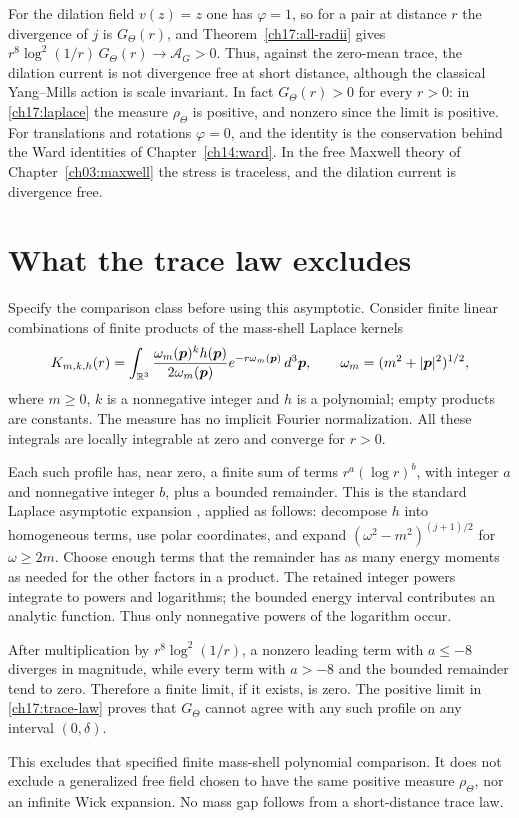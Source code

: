 For the dilation field $v(z)=z$ one has $\varphi=1$, so for a pair at
distance $r$ the divergence of $j$ is $G_\Theta(r)$, and
Theorem~\ref{ch17:all-radii} gives
$r^8\log^2(1/r)\,G_\Theta(r)\to\mathcal A_G>0$. Thus, against the zero-mean
trace, the dilation current is not divergence free at short distance, although the classical
Yang--Mills action is scale invariant. In fact $G_\Theta(r)>0$ for every
$r>0$: in \eqref{ch17:laplace} the measure $\rho_\Theta$ is positive, and
nonzero since the limit is positive. For translations and rotations
$\varphi=0$, and the identity is the conservation behind the Ward identities
of Chapter~\ref{ch14:ward}. In the free Maxwell theory of
Chapter~\ref{ch03:maxwell} the stress is traceless, and the dilation
current is divergence free.


\section{What the trace law excludes}
\label{ch17:exclusion}

Specify the comparison class before using this asymptotic. Consider finite
linear combinations of finite products of the mass-shell Laplace kernels
\[
 K_{m,k,h}(r)=\int_{\mathbb R^3}
 \frac{\omega_m(\boldsymbol p)^k h(\boldsymbol p)}{2\omega_m(\boldsymbol p)}
 e^{-r\omega_m(\boldsymbol p)}\,d^3\boldsymbol p,
 \qquad\omega_m=(m^2+|\boldsymbol p|^2)^{1/2},
\]
where $m\ge0$, $k$ is a nonnegative integer and $h$ is a polynomial;
empty products are constants. The measure has no implicit Fourier
normalization. All these integrals are locally integrable at zero
and converge for $r>0$.

Each such profile has, near zero, a finite sum of terms
$r^a(\log r)^b$, with integer $a$ and nonnegative integer $b$,
plus a bounded remainder. This is the standard Laplace asymptotic expansion
\cite{Wong2001}, applied as follows: decompose $h$ into homogeneous terms,
use polar coordinates, and expand
$(\omega^2-m^2)^{(j+1)/2}$ for $\omega\ge2m$.
Choose enough terms that the remainder has as many energy moments
as needed for the other factors in a product. The retained integer
powers integrate to powers and logarithms; the bounded energy
interval contributes an analytic function. Thus only nonnegative
powers of the logarithm occur.

After multiplication by $r^8\log^2(1/r)$, a nonzero leading term
with $a\le-8$ diverges in magnitude, while every term with $a>-8$
and the bounded remainder tend to zero. Therefore a finite limit,
if it exists, is zero. The positive limit in
\eqref{ch17:trace-law} proves that $G_\Theta$ cannot agree with any
such profile on any interval $(0,\delta)$.

This excludes that specified finite mass-shell polynomial comparison.
It does not exclude a generalized free field chosen to have the
same positive measure $\rho_\Theta$, nor an infinite Wick expansion.
No mass gap follows from a short-distance trace law.
